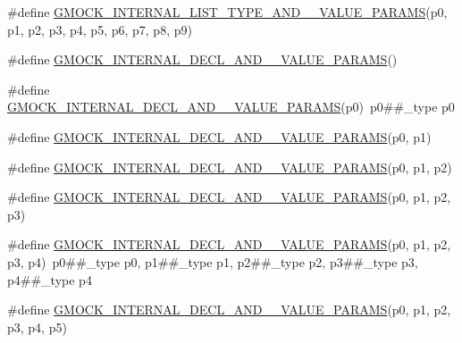 \begin{DoxyCompactItemize}
\item 
\#define \mbox{\hyperlink{googletest-master_2googlemock_2include_2gmock_2gmock-generated-actions_8h_a646b96a3f316fa629cf7faaf509de76e}{G\+M\+O\+C\+K\+\_\+\+I\+N\+T\+E\+R\+N\+A\+L\+\_\+\+L\+I\+S\+T\+\_\+\+T\+Y\+P\+E\+\_\+\+A\+N\+D\+\_\+\_\+\+V\+A\+L\+U\+E\+\_\+\+P\+A\+R\+A\+MS}}(p0,  p1,  p2,  p3,  p4,  p5,  p6,  p7,  p8,  p9)
\item 
\#define \mbox{\hyperlink{googletest-master_2googlemock_2include_2gmock_2gmock-generated-actions_8h_afbcc498768661d32cb658a8eb28535a9}{G\+M\+O\+C\+K\+\_\+\+I\+N\+T\+E\+R\+N\+A\+L\+\_\+\+D\+E\+C\+L\+\_\+\+A\+N\+D\+\_\+\_\+\+V\+A\+L\+U\+E\+\_\+\+P\+A\+R\+A\+MS}}()
\item 
\#define \mbox{\hyperlink{googletest-master_2googlemock_2include_2gmock_2gmock-generated-actions_8h_a4440fd8222dde30e41f05209f06a2d00}{G\+M\+O\+C\+K\+\_\+\+I\+N\+T\+E\+R\+N\+A\+L\+\_\+\+D\+E\+C\+L\+\_\+\+A\+N\+D\+\_\+\_\+\+V\+A\+L\+U\+E\+\_\+\+P\+A\+R\+A\+MS}}(p0)~p0\#\#\+\_\+type p0
\item 
\#define \mbox{\hyperlink{googletest-master_2googlemock_2include_2gmock_2gmock-generated-actions_8h_ab11df3777b85b01132aa4057017b22ca}{G\+M\+O\+C\+K\+\_\+\+I\+N\+T\+E\+R\+N\+A\+L\+\_\+\+D\+E\+C\+L\+\_\+\+A\+N\+D\+\_\+\_\+\+V\+A\+L\+U\+E\+\_\+\+P\+A\+R\+A\+MS}}(p0,  p1)
\item 
\#define \mbox{\hyperlink{googletest-master_2googlemock_2include_2gmock_2gmock-generated-actions_8h_a81147c9dca4694a07acccd9324990585}{G\+M\+O\+C\+K\+\_\+\+I\+N\+T\+E\+R\+N\+A\+L\+\_\+\+D\+E\+C\+L\+\_\+\+A\+N\+D\+\_\+\_\+\+V\+A\+L\+U\+E\+\_\+\+P\+A\+R\+A\+MS}}(p0,  p1,  p2)
\item 
\#define \mbox{\hyperlink{googletest-master_2googlemock_2include_2gmock_2gmock-generated-actions_8h_a0580c33b8405f1820a382f9b9471f157}{G\+M\+O\+C\+K\+\_\+\+I\+N\+T\+E\+R\+N\+A\+L\+\_\+\+D\+E\+C\+L\+\_\+\+A\+N\+D\+\_\+\_\+\+V\+A\+L\+U\+E\+\_\+\+P\+A\+R\+A\+MS}}(p0,  p1,  p2,  p3)
\item 
\#define \mbox{\hyperlink{googletest-master_2googlemock_2include_2gmock_2gmock-generated-actions_8h_a0fd289b917553899d908b0f406f8f75d}{G\+M\+O\+C\+K\+\_\+\+I\+N\+T\+E\+R\+N\+A\+L\+\_\+\+D\+E\+C\+L\+\_\+\+A\+N\+D\+\_\+\_\+\+V\+A\+L\+U\+E\+\_\+\+P\+A\+R\+A\+MS}}(p0,  p1,  p2,  p3,  p4)~p0\#\#\+\_\+type p0, p1\#\#\+\_\+type p1, p2\#\#\+\_\+type p2, p3\#\#\+\_\+type p3, p4\#\#\+\_\+type p4
\item 
\#define \mbox{\hyperlink{googletest-master_2googlemock_2include_2gmock_2gmock-generated-actions_8h_a80b3221bf467d72d15120045c9f52a6e}{G\+M\+O\+C\+K\+\_\+\+I\+N\+T\+E\+R\+N\+A\+L\+\_\+\+D\+E\+C\+L\+\_\+\+A\+N\+D\+\_\+\_\+\+V\+A\+L\+U\+E\+\_\+\+P\+A\+R\+A\+MS}}(p0,  p1,  p2,  p3,  p4,  p5)

\end{DoxyCompactItemize}
